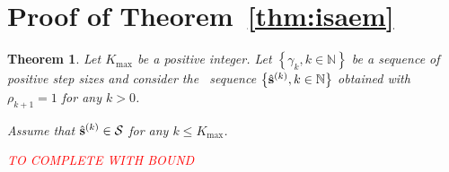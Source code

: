 \documentclass[11pt]{article}
\newtheorem*{Theorem*}{Theorem}
\theoremstyle{t}
\begin{document}
\section{Proof of Theorem~\ref{thm:isaem}}\label{app:theoremisaem}
\begin{Theorem*}
Let $K_{\max }$ be a positive integer. 
Let $\left\{\gamma_{k}, k \in \mathbb{N}\right\}$ be a sequence of positive step sizes and consider the \ISAEM\ sequence $\left\{\hat{\bss}^{(k)}, k \in \mathbb{N}\right\}$ obtained with $\rho_{k+1}=1$ for any $k>0$.

Assume that $ \hat{\bss}^{(k)} \in \mathcal{S}$ for any $k \leq K_{\max }$.

\textcolor{red}{TO COMPLETE WITH BOUND}

\end{Theorem*} 
\end{document}

